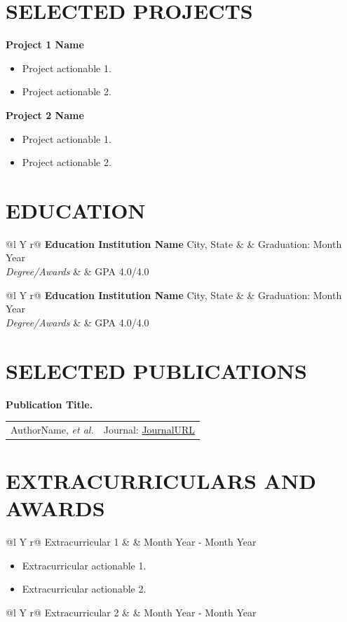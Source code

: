 \documentclass[a4paper,11pt]{article}
\makeatletter
\newenvironment{project}[1]
{%
	\vspace{2pt}
	\textbf{#1}\par
	\begin{itemize}
} 
{%
	\end{itemize}
}
\newenvironment{extraList}[2]
{%
	\begin{tabularx}{\linewidth}{@{}l Y r@{}}
		#1 & \hfill & #2 \\
	\end{tabularx}
	\begin{itemize}
}
{%
	\end{itemize}
}
\newenvironment{extra}[2]
{%
	\begin{tabularx}{\linewidth}{@{}l Y r@{}}
		#1 & \hfill & #2 \\
	\end{tabularx}
}
{}
\newcommand{\education}[5]
{%
	\begin{tabularx}{\linewidth}{@{}l Y r@{}}
		\textbf{#1 \textbar} #2 & \hfill & Graduation: #3 \\
		\textit{#4} & \hfill & GPA #5/4.0
	\end{tabularx}%
}
\newcommand{\publication}[4]
{%
	\textbf{#1}\par
	\begin{tabularx}{\linewidth}{@{}X r@{}}	
		#2 & #3: \href{#4}{#4} \\
	\end{tabularx}%
}
\makeatother
\begin{document}
	\section{SELECTED PROJECTS}
	\begin{project}{Project 1 Name}
		\item Project actionable 1.
		\item Project actionable 2.
	\end{project}	
	\begin{project}{Project 2 Name}	
		\item Project actionable 1.
		\item Project actionable 2.
	\end{project}
	
	\section{EDUCATION}
	\education
	{Education Institution Name}{City, State}{Month Year}{Degree/Awards}{4.0}
	
	\education
	{Education Institution Name}{City, State}{Month Year}{Degree/Awards}{4.0}
	
	\section{SELECTED PUBLICATIONS}
	\publication
	{Publication Title.}
	{AuthorName, \textit{et al.}}{Journal}{JournalURL}
	
	\section{EXTRACURRICULARS AND AWARDS}	
	\begin{extraList}{Extracurricular 1}{Month Year - Month Year}
		\item Extracurricular actionable 1.
		\item Extracurricular actionable 2.
	\end{extraList}
	\begin{extra}{Extracurricular 2}{Month Year - Month Year}
	\end{extra}
\end{document}
